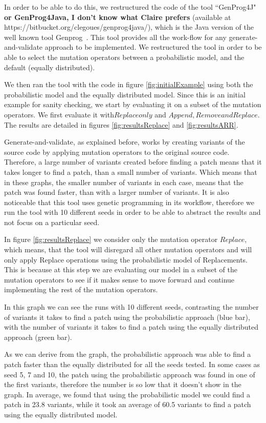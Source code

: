 \documentclass[conference]{IEEEtran}
\newcommand{\todo}[1]
  {{\scriptsize \textbf{\color{red} {#1}}}}
\begin{document}
In order to be able to do this, we restructured the code of the tool ``GenProg4J" 
\todo{or GenProg4Java, I don't know what Claire prefers} (available at 
https://bitbucket.org/clegoues/genprog4java/), which is the Java version of the 
well known tool Genprog~\cite{legoues12}. This tool provides all the work-flow 
for any generate-and-validate approach to be implemented. We restructured the 
tool in order to be able to select the mutation operators between a 
probabilistic model, and the default (equally distributed).

We then ran the tool with the code in figure \ref{fig:initialExample} using both 
the probabilistic model and the equally distributed model. Since this is an 
initial example for sanity checking, we start by evaluating it on a subset of 
the mutation operators. We first evaluate it with$ Replace only$ and $Append, 
Remove and Replace$. The results are detailed in figures 
\ref{fig:resultsReplace} and \ref{fig:resultsARR}. 

Generate-and-validate, as explained before, works by creating variants of the 
source code by applying mutation operators to the original source code. 
Therefore, a large number of variants created before finding a patch means that 
it takes longer to find a patch, than a small number of variants. Which means 
that in these graphs, the smaller number of variants in each case, means that 
the patch was found faster, than with a larger number of variants. It is also 
noticeable that this tool uses genetic programming in its workflow, therefore we 
run the tool with 10 different seeds in order to be able to abstract the results 
and not focus on a particular seed.

In figure \ref{fig:resultsReplace} we consider only the mutation operator 
$Replace$, which means, that the tool will disregard all other mutation 
operators and will only apply Replace operations using the probabilistic model 
of Replacements. This is because at this step we are evaluating our model in a 
subset of the mutation operators to see if it makes sense to move forward and 
continue implementing the rest of the mutation operators.

In this graph we can see the runs with 10 different seeds, contrasting the 
number of variants it takes to find a patch using the probabilistic approach 
(blue bar), with the number of variants it takes to find a patch using the 
equally distributed approach (green bar). 

As we can derive from the graph, the probabilistic approach was able to find a 
patch faster than the equally distributed for all the seeds tested. In some 
cases as seed 5, 7 and 10, the patch using the probabilistic approach was found 
in one of the first variants, therefore the number is so low that it doesn't 
show in the graph. In average, we found that using the probabilistic model we 
could find a patch in 23.8 variants, while it took an average of 60.5 variants 
to find a patch using the equally distributed model.
\end{document}

